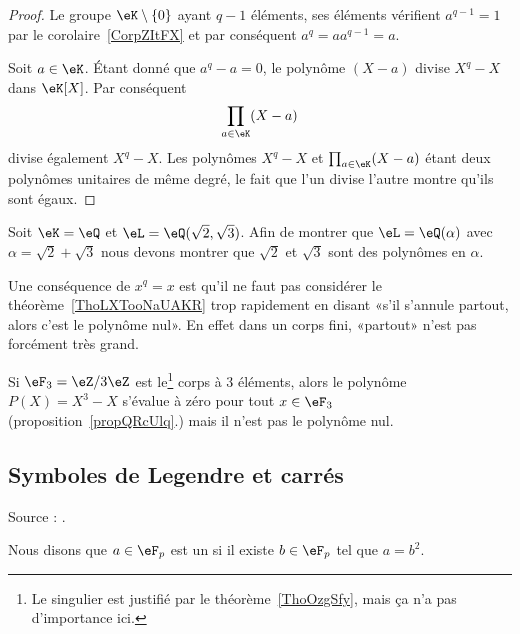 \begin{proof}
	Le groupe \( \eK\setminus\{ 0 \}\) ayant \( q-1\) éléments, ses éléments vérifient \( a^{q-1}=1\) par le corolaire~\ref{CorpZItFX} et par conséquent \( a^q=aa^{q-1}=a \).

	Soit \( a\in \eK\). Étant donné que \( a^q-a=0\), le polynôme \( (X-a)\) divise \( X^q-X\) dans \( \eK[X]\). Par conséquent
	\begin{equation}
		\prod_{a\in \eK}(X-a)
	\end{equation}
	divise également \( X^q-X\). Les polynômes \( X^q-X\) et \( \prod_{a\in \eK}(X-a)\) étant deux polynômes unitaires de même degré, le fait que l'un divise l'autre montre qu'ils sont égaux.
\end{proof}

\begin{example}
	Soit \( \eK=\eQ\) et \( \eL=\eQ(\sqrt{2},\sqrt{3})\). Afin de montrer que \( \eL=\eQ(\alpha)\) avec \( \alpha=\sqrt{2}+\sqrt{3}\) nous devons montrer que \( \sqrt{2}\) et \( \sqrt{3}\) sont des polynômes en \( \alpha\).
\end{example}

Une conséquence de \( x^q=x\) est qu'il ne faut pas considérer le théorème~\ref{ThoLXTooNaUAKR} trop rapidement en disant «s'il s'annule partout, alors c'est le polynôme nul». En effet dans un corps fini, «partout» n'est pas forcément très grand.

\begin{example}\label{exVQBooBMPLkD}
	Si \( \eF_3=\eZ/3\eZ\) est le\footnote{Le singulier est justifié par le théorème~\ref{ThoOzgSfy}, mais ça n'a pas d'importance ici.} corps à \( 3\)
	éléments, alors le polynôme \( P(X)=X^3-X\) s'évalue à zéro pour tout \( x\in \eF_3\) (proposition~\ref{propQRcUlq}.) mais il n'est pas le polynôme nul.
\end{example}

\subsection{Symboles de Legendre et carrés}

Source : \cite{RecQuadVento}.

Nous disons que \( a\in \eF_p\) est un  si il existe \( b\in \eF_p\) tel que \( a=b^2\).

